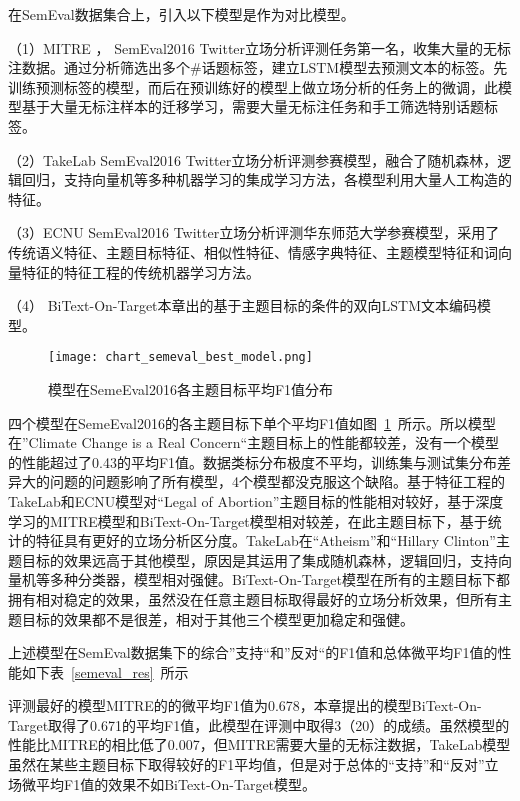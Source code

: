 在SemEval数据集合上，引入以下模型是作为对比模型。

（1）MITRE \cite{zarrella2016mitre}， SemEval2016 Twitter立场分析评测任务第一名，收集大量的无标注数据。通过分析筛选出多个\#话题标签，建立LSTM模型去预测文本的标签。先训练预测标签的模型，而后在预训练好的模型上做立场分析的任务上的微调，此模型基于大量无标注样本的迁移学习，需要大量无标注任务和手工筛选特别话题标签。

（2）TakeLab \cite{tutek2016takelab}  SemEval2016 Twitter立场分析评测参赛模型，融合了随机森林，逻辑回归，支持向量机等多种机器学习的集成学习方法，各模型利用大量人工构造的特征。

（3）ECNU\cite{zhang2016ecnu}  SemEval2016 Twitter立场分析评测华东师范大学参赛模型，采用了传统语义特征、主题目标特征、相似性特征、情感字典特征、主题模型特征和词向量特征的特征工程的传统机器学习方法。

（4） BiText-On-Target本章出的基于主题目标的条件的双向LSTM文本编码模型。

\begin{figure}[htbp]
	\centering
	\texttt{[image: chart\_semeval\_best\_model.png]}
	\caption[rnn_vanish]{模型在SemeEval2016各主题目标平均F1值分布}
	\label{chart_semeval_best_model}
\end{figure}
四个模型在SemeEval2016的各主题目标下单个平均F1值如图~\ref{chart_semeval_best_model}~所示。所以模型在”Climate Change is a Real Concern“主题目标上的性能都较差，没有一个模型的性能超过了0.43的平均F1值。数据类标分布极度不平均，训练集与测试集分布差异大的问题的问题影响了所有模型，4个模型都没克服这个缺陷。基于特征工程的TakeLab和ECNU模型对“Legal of Abortion”主题目标的性能相对较好，基于深度学习的MITRE模型和BiText-On-Target模型相对较差，在此主题目标下，基于统计的特征具有更好的立场分析区分度。TakeLab在“Atheism”和“Hillary Clinton”主题目标的效果远高于其他模型，原因是其运用了集成随机森林，逻辑回归，支持向量机等多种分类器，模型相对强健。BiText-On-Target模型在所有的主题目标下都拥有相对稳定的效果，虽然没在任意主题目标取得最好的立场分析效果，但所有主题目标的效果都不是很差，相对于其他三个模型更加稳定和强健。

上述模型在SemEval数据集下的综合”支持“和”反对“的F1值和总体微平均F1值的性能如下表~\ref{semeval_res}~所示

评测最好的模型MITRE的的微平均F1值为0.678，本章提出的模型BiText-On-Target取得了0.671的平均F1值，此模型在评测中取得3（20）的成绩。虽然模型的性能比MITRE的相比低了0.007，但MITRE需要大量的无标注数据，TakeLab模型虽然在某些主题目标下取得较好的F1平均值，但是对于总体的“支持”和“反对”立场微平均F1值的效果不如BiText-On-Target模型。

